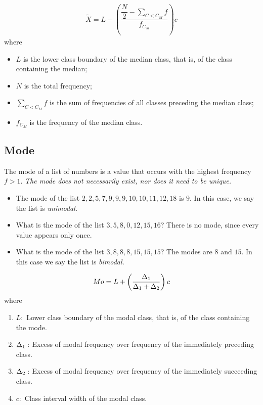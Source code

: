 \begin{definition}
	\begin{align}
		\tilde{X}=L+\left(
		\dfrac{ \dfrac{N}{2}-\sum_{{C<C_{M}}}f}{f_{C_{M}}}
		\right)c
	\end{align}
	where 
	\begin{itemize}
		\item $L$ is the lower class boundary of the median class, that is, of the class containing the median;
		\item $N$ is the total frequency; 
		\item $\sum_{{C<C_{M}}}f$ is the sum of frequencies of all classes preceding the median class; 
		\item $f_{C_{M}}$ is the frequency of the median class.
	\end{itemize}
	
\end{definition}


\subsection{Mode}
The mode of a list of numbers is a value that occurs with the highest frequency $f>1$. \emph{The mode does not necessarily exist, nor does it need to be unique.}


\begin{example}
	\begin{itemize}
		\item The mode of the list $2,2,5,7,9,9,9,10,10,11,12,18$ is $9$. In this case, we say the list is \emph{unimodal.}
		\item What is the mode of the list $3,5,8,0,12,15,16$? There is no mode, since every value appears only once.
		\item What is the mode of the list $3,8,8,8,15,15,15$? The modes are $8$ and $15$. In this case we say the list is \emph{bimodal.}
	\end{itemize}
	
\end{example}



\begin{definition}
	\begin{align}
		Mo=
		L + \left( \dfrac{\Delta_{1}}{\Delta_{1}+\Delta_{2}} \right)c
	\end{align}
	where 
	\begin{enumerate}
		\item $L:$ Lower class boundary of the modal class, that is, of the class containing the mode.
		\item $\Delta_{1}:$ Excess of modal frequency over frequency of the immediately preceding class. 
		\item $\Delta_{2}:$ Excess of modal frequency over frequency of the immediately succeeding class. 
		\item $c:$ Class interval width of the modal class.
	\end{enumerate}
	
\end{definition}


